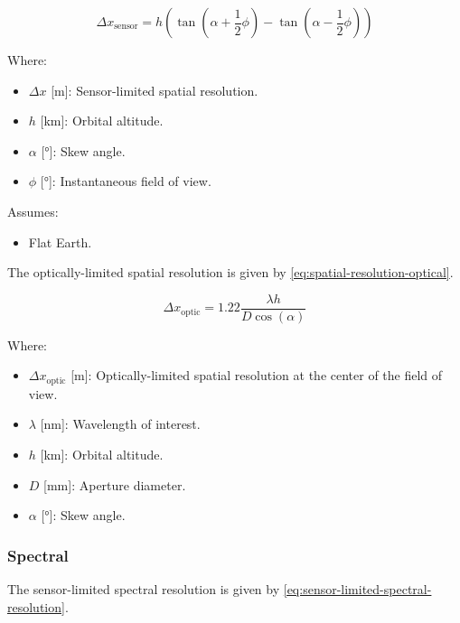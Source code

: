\documentclass{article}
\begin{document}
\begin{equation} \label{eq:spatial-resolution-sensor}
    \Delta x_{\text{sensor}} = h \left(\tan{\left(\alpha + \frac{1}{2} \phi \right)} - \tan{\left(\alpha - \frac{1}{2} \phi \right)} \right)
\end{equation}

Where:
\begin{itemize}[label={}]
    \item $\Delta x$ [\si{\m}]: Sensor-limited spatial resolution.
    \item $h$ [\si{\km}]: Orbital altitude.
    \item $\alpha$ [\si{\degree}]: Skew angle.
    \item $\phi$ [\si{\degree}]: Instantaneous field of view.
\end{itemize}

Assumes:
\begin{itemize}
    \item Flat Earth. 
\end{itemize}

The optically-limited spatial resolution is given by \eqref{eq:spatial-resolution-optical}.

\begin{equation} \label{eq:spatial-resolution-optical}
    \Delta x_{\text{optic}} = 1.22\frac{\lambda h}{D \cos{\left( \alpha \right)}}
\end{equation}

Where:
\begin{itemize}[label={}]
    \item $\Delta x_{\text{optic}}$ [\si{\m}]: Optically-limited spatial resolution at the center of the field of view.
    \item $\lambda$ [\si{\nm}]: Wavelength of interest.
    \item $h$ [\si{\km}]: Orbital altitude.
    \item $D$ [\si{\mm}]: Aperture diameter.
    \item $\alpha$ [\si{\degree}]: Skew angle.
\end{itemize}


\subsubsection{Spectral}

The sensor-limited spectral resolution is given by \eqref{eq:sensor-limited-spectral-resolution}.
\end{document}
